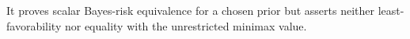 It proves scalar Bayes-risk equivalence for a chosen prior but asserts neither least-favorability nor equality with the unrestricted minimax value.
